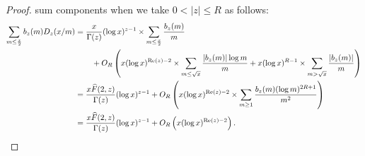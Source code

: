 \documentclass[11pt,reqno,a4letter]{article}
\numberwithin{figure}{section}
\numberwithin{table}{section}
\theoremstyle{plain}
\numberwithin{theorem}{section}
\theoremstyle{definition}
\renewcommand{\Re}{\operatorname{Re}}
\begin{document}
\begin{proof}
sum components when we take $0 < |z| \leq R$ as follows: 
\begin{align*} 
\sum_{m \leq \frac{x}{2}} b_z(m) D_z(x/m) & = \frac{x}{\Gamma(z)} (\log x)^{z-1} \times 
     \sum_{m \leq \frac{x}{2}} \frac{b_z(m)}{m} \\ 
     & \phantom{=\quad\ } + 
     O_R\left(x (\log x)^{\Re(z)-2} \times \sum_{m \leq \sqrt{x}} \frac{|b_z(m)| \log m}{m} + 
     x (\log x)^{R-1} \times \sum_{m > \sqrt{x}} \frac{|b_z(m)|}{m}\right) \\ 
     & = \frac{x \widehat{F}(2, z)}{\Gamma(z)} (\log x)^{z-1} + O_R\left( 
     x (\log x)^{\Re(z)-2} \times \sum_{m \geq 1} \frac{b_z(m) (\log m)^{2R+1}}{m^2} 
     \right) \\ 
     & = \frac{x \widehat{F}(2, z)}{\Gamma(z)} (\log x)^{z-1} + O_{R}\left( 
     x (\log x)^{\Re(z)-2}\right). 
     \qedhere  
\end{align*} 
\end{proof} 
\end{document}
